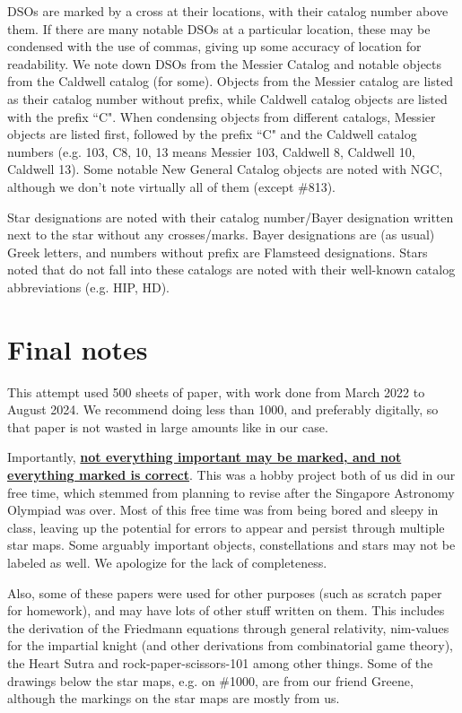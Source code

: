 \documentclass{article}
\begin{document}
DSOs are marked by a cross at their locations, with their catalog number above them. If there are many notable DSOs at a particular location, these may be condensed with the use of commas, giving up some accuracy of location for readability. We note down DSOs from the Messier Catalog and notable objects from the Caldwell catalog (for some). Objects from the Messier catalog are listed as their catalog number without prefix, while Caldwell catalog objects are listed with the prefix ``C". When condensing objects from different catalogs, Messier objects are listed first, followed by the prefix ``C" and the Caldwell catalog numbers (e.g. 103, C8, 10, 13 means Messier 103, Caldwell 8, Caldwell 10, Caldwell 13). Some notable New General Catalog objects are noted with NGC, although we don't note virtually all of them (except \#813).

Star designations are noted with their catalog number/Bayer designation written next to the star without any crosses/marks. Bayer designations are (as usual) Greek letters, and numbers without prefix are Flamsteed designations. Stars noted that do not fall into these catalogs are noted with their well-known catalog abbreviations (e.g. HIP, HD).
\section{Final notes}
This attempt used 500 sheets of paper, with work done from March 2022 to August 2024. We recommend doing less than 1000, and preferably digitally, so that paper is not wasted in large amounts like in our case.

Importantly, \ul{\textbf{not everything important may be marked, and not everything marked is correct}}. This was a hobby project both of us did in our free time, which stemmed from planning to revise after the Singapore Astronomy Olympiad was over. Most of this free time was from being bored and sleepy in class, leaving up the potential for errors to appear and persist through multiple star maps. Some arguably important objects, constellations and stars may not be labeled as well. We apologize for the lack of completeness.

Also, some of these papers were used for other purposes (such as scratch paper for homework), and may have lots of other stuff written on them. This includes the derivation of the Friedmann equations through general relativity, nim-values for the impartial knight (and other derivations from combinatorial game theory), the Heart Sutra and rock-paper-scissors-101 among other things. Some of the drawings below the star maps, e.g. on \#1000, are from our friend Greene, although the markings on the star maps are mostly from us.
\end{document}
